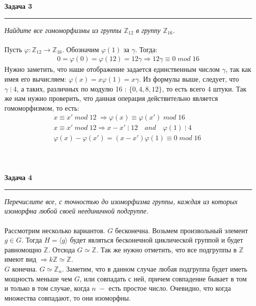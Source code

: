 \documentclass[a4paper,11pt]{article}
\begin{document}
\textbf{\large Задача 3}
\medskip\hrule\medskip
\textit{Найдите все гомоморфизмы из группы $ \mathbb{Z}_{12} $ в группу $ \mathbb{Z}_{16} $.} \\ \\ 
Пусть $ \varphi : \mathbb{Z}_{12} \to \mathbb{Z}_{16}$. Обозначим $ \varphi(1) $ за  $ \gamma $. Тогда: 
\begin{gather*}
	0 = \varphi(0) = \varphi(12) = 12\gamma \Rightarrow 12\gamma \equiv 0 \; mod \;16 
\end{gather*}
Нужно заметить, что наше отображение задается единственным числом $ \gamma $, так как имея его вычисляем: $ \varphi(x) = x \varphi(1) = x\gamma $. Из формулы выше, следует, что $ \gamma \; \vdots \; 4$, а таких, различных по модулю 16 : $ \{0, 4, 8, 12\} $, то есть всего 4 штуки. Так же нам нужно проверить, что данная операция действительно является гомоморфизмом, то есть:
\begin{gather*}
x \equiv x' \; mod \; 12 \; \Rightarrow \varphi(x) \equiv \varphi (x') \; mod \; 16 \; \\
x \equiv x' \; mod \; 12 \Rightarrow x - x' \; \vdots \; 12 \quad and \quad \varphi(1) \; \vdots \; 4 \\
\varphi(x) - \varphi(x') = (x - x')\varphi(1) \equiv 0 \; mod \; 16 \;  
\end{gather*} \\ \\ \\





\textbf{\large Задача 4}
\medskip\hrule\medskip
\textit{Перечислите все, с точностью до изоморфизма группы, каждая из которых изоморфна любой своей неединичной подгруппе. } \\ \\
Рассмотрим несколько вариантов. $ G $ бесконечна. Возьмем произвольный элемент $ g \in G $. Тогда $ H = \langle g \rangle $ будет являться бесконечной циклической группой и будет равномощно $ \mathbb{Z} $. Отсюда $ G \simeq \mathbb{Z} $.  Так же нужно отметить, что все подгруппы в $ \mathbb{Z} $ имеют вид $ \Rightarrow k\mathbb{Z} \simeq \mathbb{Z}$.\\[2pt]
$ G $ конечна. $ G \simeq \mathbb{Z}_n $. Заметим, что в данном случае  любая подгруппа будет иметь мощность меньше чем $ G $, или совпадать с ней, причем совпадение бывает в том и только в том случае, когда $ n \; -$ есть простое число. Очевидно, что когда множества совпадают, то они изоморфны.
\end{document}
